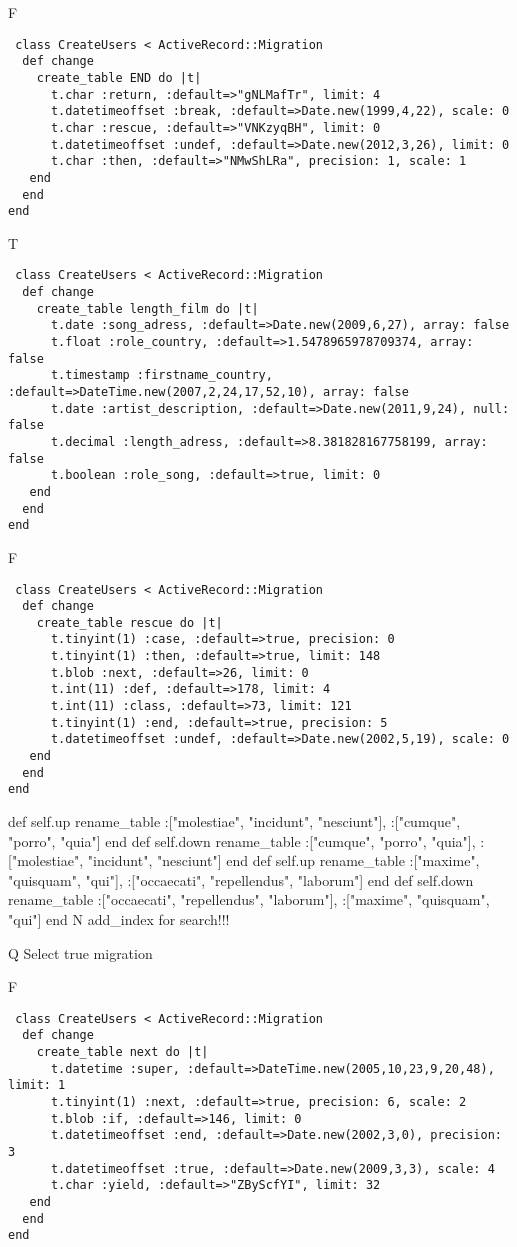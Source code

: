 F
\begin{verbatim}
 class CreateUsers < ActiveRecord::Migration 
  def change 
    create_table END do |t| 
      t.char :return, :default=>"gNLMafTr", limit: 4
      t.datetimeoffset :break, :default=>Date.new(1999,4,22), scale: 0
      t.char :rescue, :default=>"VNKzyqBH", limit: 0
      t.datetimeoffset :undef, :default=>Date.new(2012,3,26), limit: 0
      t.char :then, :default=>"NMwShLRa", precision: 1, scale: 1
   end 
  end 
end
\end{verbatim}

T
\begin{verbatim}
 class CreateUsers < ActiveRecord::Migration 
  def change 
    create_table length_film do |t| 
      t.date :song_adress, :default=>Date.new(2009,6,27), array: false
      t.float :role_country, :default=>1.5478965978709374, array: false
      t.timestamp :firstname_country, :default=>DateTime.new(2007,2,24,17,52,10), array: false
      t.date :artist_description, :default=>Date.new(2011,9,24), null: false
      t.decimal :length_adress, :default=>8.381828167758199, array: false
      t.boolean :role_song, :default=>true, limit: 0
   end 
  end 
end
\end{verbatim}

F
\begin{verbatim}
 class CreateUsers < ActiveRecord::Migration 
  def change 
    create_table rescue do |t| 
      t.tinyint(1) :case, :default=>true, precision: 0
      t.tinyint(1) :then, :default=>true, limit: 148
      t.blob :next, :default=>26, limit: 0
      t.int(11) :def, :default=>178, limit: 4
      t.int(11) :class, :default=>73, limit: 121
      t.tinyint(1) :end, :default=>true, precision: 5
      t.datetimeoffset :undef, :default=>Date.new(2002,5,19), scale: 0
   end 
  end 
end
\end{verbatim}
	 def self.up
       rename_table :["molestiae", "incidunt", "nesciunt"], :["cumque", "porro", "quia"]
     end 
     def self.down
       rename_table :["cumque", "porro", "quia"], :["molestiae", "incidunt", "nesciunt"]
     end
	 def self.up
       rename_table :["maxime", "quisquam", "qui"], :["occaecati", "repellendus", "laborum"]
     end 
     def self.down
       rename_table :["occaecati", "repellendus", "laborum"], :["maxime", "quisquam", "qui"]
     end
N
add_index for search!!!
  
Q
Select true migration

F
\begin{verbatim}
 class CreateUsers < ActiveRecord::Migration 
  def change 
    create_table next do |t| 
      t.datetime :super, :default=>DateTime.new(2005,10,23,9,20,48), limit: 1
      t.tinyint(1) :next, :default=>true, precision: 6, scale: 2
      t.blob :if, :default=>146, limit: 0
      t.datetimeoffset :end, :default=>Date.new(2002,3,0), precision: 3
      t.datetimeoffset :true, :default=>Date.new(2009,3,3), scale: 4
      t.char :yield, :default=>"ZByScfYI", limit: 32
   end 
  end 
end
\end{verbatim}

